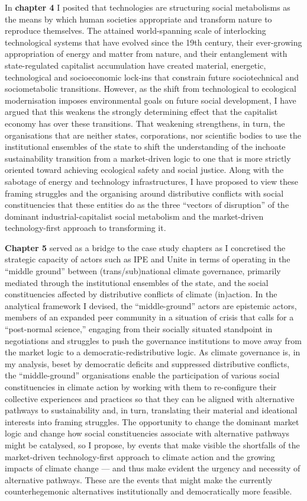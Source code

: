 \documentclass[a4paper, nobind]{templates/ociamthesis}
\begin{document}
In \textbf{chapter 4} I posited that technologies are structuring social metabolisms as the means by which human societies appropriate and transform nature to reproduce themselves. The attained world-spanning scale of interlocking technological systems that have evolved since the 19th century, their ever-growing appropriation of energy and matter from nature, and their entanglement with state-regulated capitalist accumulation have created material, energetic, technological and socioeconomic lock-ins that constrain future sociotechnical and sociometabolic transitions. However, as the shift from technological to ecological modernisation imposes environmental goals on future social development, I have argued that this weakens the strongly determining effect that the capitalist economy has over these transitions. That weakening strengthens, in turn, the organisations that are neither states, corporations, nor scientific bodies to use the institutional ensembles of the state to shift the understanding of the inchoate sustainability transition from a market-driven logic to one that is more strictly oriented toward achieving ecological safety and social justice. Along with the sabotage of energy and technology infrastructures, I have proposed to view these framing struggles and the organising around distributive conflicts with social constituencies that these entities do as the three ``vectors of disruption'' of the dominant industrial-capitalist social metabolism and the market-driven technology-first approach to transforming it.

\textbf{Chapter 5} served as a bridge to the case study chapters as I concretised the strategic capacity of actors such as IPE and Unite in terms of operating in the ``middle ground'' between (trans/sub)national climate governance, primarily mediated through the institutional ensembles of the state, and the social constituencies affected by distributive conflicts of climate (in)action. In the analytical framework I devised, the ``middle-ground'' actors are epistemic actors, members of an expanded peer community in a situation of crisis that calls for a ``post-normal science,'' engaging from their socially situated standpoint in negotiations and struggles to push the governance institutions to move away from the market logic to a democratic-redistributive logic. As climate governance is, in my analysis, beset by democratic deficits and suppressed distributive conflicts, the ``middle-ground'' organisations enable the participation of various social constituencies in climate action by working with them to re-configure their collective experiences and practices so that they can be aligned with alternative pathways to sustainability and, in turn, translating their material and ideational interests into framing struggles. The opportunity to change the dominant market logic and change how social constituencies associate with alternative pathways might be catalysed, so I propose, by events that make visible the shortfalls of the market-driven technology-first approach to climate action and the growing impacts of climate change --- and thus make evident the urgency and necessity of alternative pathways. These are the events that might make the currently counterhegemonic alternatives institutionally and democratically more feasible.
\end{document}
